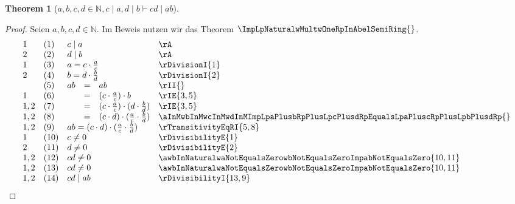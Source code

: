 \documentclass{book}
\theoremstyle{plain}
\newtheorem{theorem}{Theorem}
\theoremstyle{remark}
\theoremstyle{definition}
\begin{document}
\label{awbwcwdInNaturalwcMidawdMidbImpcdMidab}
\begin{theorem}[\(a,b,c,d\in\mathbb{N},c\mid a, d\mid b\vdash cd\mid ab\)]
\end{theorem}
\begin{proof}
Seien \(a,b,c,d\in\mathbb{N}\).
Im Beweis nutzen wir das Theorem \(\ImpLpNaturalwMultwOneRpInAbelSemiRing{}\). 
    \[
	\begin{array}{llclll}
    1       &  (1)  & \multicolumn{3}{l}{c\mid a} & \rA \\
    2       &  (2)  & \multicolumn{3}{l}{d\mid b} & \rA \\
    1       &  (3)  & \multicolumn{3}{l}{a=c\cdot \frac{a}{c}} & \rDivisionI{1} \\
    2       &  (4)  & \multicolumn{3}{l}{b=d\cdot \frac{b}{d}} & \rDivisionI{2} \\
            &  (5)  & ab&=&ab & \rII{} \\
    1       &  (6)  & &=&(c\cdot \frac{a}{c})\cdot b & \rIE{3,5} \\
    1,2     &  (7)  & &=&(c\cdot \frac{a}{c})\cdot (d\cdot \frac{b}{d}) & \rIE{3,5} \\
    1,2       &  (8)  & &=&(c\cdot d)\cdot (\frac{a}{c}\cdot \frac{b}{d}) & \aInMwbInMwcInMwdInMImpLpaPlusbRpPlusLpcPlusdRpEqualsLpaPluscRpPlusLpbPlusdRp{} \\
    1,2       &  (9) &\multicolumn{3}{l}{ab=(c\cdot d)\cdot (\frac{a}{c}\cdot \frac{b}{d})} & \rTransitivityEqRI{5,8} \\
    1       &  (10)  & \multicolumn{3}{l}{c\neq 0} & \rDivisibilityE{1} \\
    2       &  (11)  & \multicolumn{3}{l}{d\neq 0} & \rDivisibilityE{2} \\
    1,2     &  (12)  & \multicolumn{3}{l}{cd\neq 0} & \awbInNaturalwaNotEqualsZerowbNotEqualsZeroImpabNotEqualsZero{10,11} \\
    1,2     &  (13)  & \multicolumn{3}{l}{cd\neq 0} & \awbInNaturalwaNotEqualsZerowbNotEqualsZeroImpabNotEqualsZero{10,11} \\
    1,2     &  (14)  & \multicolumn{3}{l}{cd\mid ab} & \rDivisibilityI{13,9} \\
    \end{array}
	\]
\end{proof}
\end{document}
